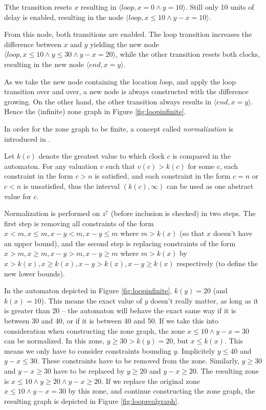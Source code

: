 Tthe transition resets $x$ resulting in $\langle loop, x=0 \wedge y=10 \rangle$. Still only 10 units of delay is enabled, resulting in the node $\langle loop, x \leq 10 \wedge y-x=10 \rangle$.

From this node, both transitions are enabled. The loop transition increases the difference between $x$ and $y$ yielding the new node $\langle loop, x \leq 10 \wedge y \leq 30 \wedge y-x=20 \rangle$, while the other transition resets both clocks, resulting in the new node $\langle end, x=y \rangle$.

As we take the new node containing the location $loop$, and apply the loop transition over and over, a new node is always constructed with the difference growing. On the other hand, the other transition always results in $\langle end, x=y \rangle$.
Hence the (infinite) zone graph in Figure \ref{fig:loopinfinite}.

In order for the zone graph to be finite, a concept called \emph{normalization} is introduced in \cite{bengtsson2004timed}.

Let $k(c)$ denote the greatest value to which clock $c$ is compared in the automaton.
For any valuation $v$ such that $v(c)>k(c)$ for some $c$, each constraint in the form $c > n$ is satisfied, and each constraint in the form $c = n$ or $c < n$ is unsatisfied, thus the interval $(k(c),\infty)$ can be used as one abstract value for $c$. 

Normalization is performed on $z^\uparrow$ (before inclusion is checked) in two steps. The first step is removing all constraints of the form $x < m, x \leq m, x-y <m, x-y\leq m$ where $m>k(x)$ (so that $x$ doesn't have an upper bound), and the second step is replacing constraints of the form $x > m, x \geq m, x-y >m, x-y\geq m$ where $m>k(x)$ by $x > k(x), x \geq k(x), x-y >k(x), x-y\geq k(x)$ respectively (to define the new lower bounds).

In the automaton depicted in Figure \ref{fig:loopinfinite}, $k(y)=20$ (and $k(x)=10$). This means the exact value of $y$ doesn't really matter, as long as it is greater than 20 -- the automaton will behave the exact same way if it is between 30 and 40, or if it is between 40 and 50. %
If we take this into consideration when constructing the zone graph, the zone  $x \leq 10 \wedge y-x=30$ can be normalized. In this zone, $y \geq 30 > k(y)=20$, but $x \leq k(x)$. This means we only have to consider constraints bounding $y$.
Implicitely $y \leq 40$ and $y-x \leq 30$. These constraints have to be removed from the zone. Similarly, $y \geq 30$ and $y-x \geq 30$ have to be replaced by $y \geq 20$ and $y-x \geq 20$. The resulting zone is $x \leq 10 \wedge y \geq 20 \wedge y-x \geq 20$. If we replace the original zone  $x \leq 10 \wedge y-x=30$ by this zone, and continue constructing the zone graph, the resulting graph is depicted in Figure \ref{fig:looprealgraph}.

